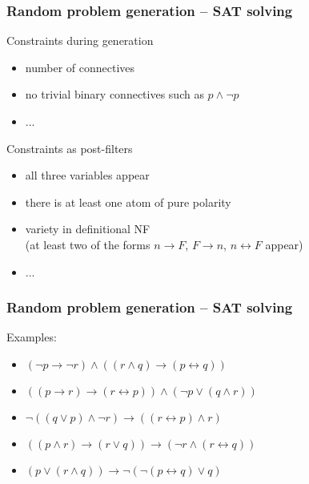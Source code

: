 \documentclass[xcolor={table}]{beamer}
\newcommand{\limpl}{\rightarrow}
\newcommand{\liff}{\leftrightarrow}
\begin{document}
\begin{frame}
    \frametitle{Random problem generation -- SAT solving}

    Constraints during generation
    \begin{itemize}
        \item
            number of connectives
        \item
            no trivial binary connectives such as $p \land \lnot p$
        \item
            ...
    \end{itemize}

    \bigskip
    \pause

    Constraints as post-filters
    \begin{itemize}
        \item
            all three variables appear
        \item
            there is at least one atom of pure polarity
        \item
            variety in definitional NF \\
            (at least two of the forms $n \limpl F$, $F \limpl n$, $n \liff F$ appear)
        \item
            ...
    \end{itemize}
\end{frame}

\begin{frame}
    \frametitle{Random problem generation -- SAT solving}

    Examples:
    \begin{itemize}
        \item $ ( \lnot p \rightarrow \lnot r ) \land ( ( r \land q ) \rightarrow ( p \leftrightarrow q ) ) $
        \item $ ( ( p \rightarrow r ) \rightarrow ( r \leftrightarrow p ) ) \land ( \lnot p \lor ( q \land r ) ) $
        \item $ \lnot ( ( q \lor p ) \land \lnot r ) \rightarrow ( ( r \leftrightarrow p ) \land r ) $
        \item $ ( ( p \land r ) \rightarrow ( r \lor q ) ) \rightarrow ( \lnot r \land ( r \leftrightarrow q ) ) $
        \item $ ( p \lor ( r \land q ) ) \rightarrow \lnot ( \lnot ( p \leftrightarrow q ) \lor q ) $
    \end{itemize}
\end{frame}

\end{document}
